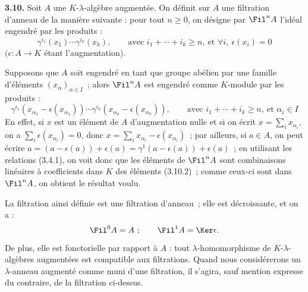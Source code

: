 \textbf{3.10.}
Soit \(A\) une \(K\)-\(\lambda\)-algèbre augmentée. On définit sur \(A\) une filtration d'anneau de la manière suivante : pour tout \(n\ge0\), on désigne par \(\Fil^n A\) l'idéal engendré par les produits :
\begin{equation}\tag{3.10.1}
  \gamma^{i_1}(x_1)\cdots\gamma^{i_k}(x_k),
  \qquad \text{avec } i_1+\cdots+i_k\ge n,\ \text{et } \forall i,\ \epsilon(x_i)=0
\end{equation}
\((\epsilon:A\to K\) étant l'augmentation).

Supposons que \(A\) soit engendré en tant que groupe abélien par une famille d'éléments \((x_\alpha)_{\alpha\in I}\)~; alors \(\Fil^n A\) est engendré comme \(K\)-module par les produits :
\begin{equation}\tag{3.10.2}
  \gamma^{i_1}(x_{\alpha_1}-\epsilon(x_{\alpha_1}))\cdots
  \gamma^{i_k}(x_{\alpha_k}-\epsilon(x_{\alpha_k})),
  \qquad \text{avec } i_1+\cdots+i_k\ge n,\ \text{et } \alpha_i\in I
\end{equation}
En effet, si \(x\) est un élément de \(A\) d'augmentation nulle et si on écrit \(x=\sum_i x_{\alpha_i}\), on a \(\sum_i \epsilon(x_{\alpha_i})=0\), donc \(x=\sum_i x_{\alpha_i}-\epsilon(x_{\alpha_i})\)~; par ailleurs, si \(a\in A\), on peut écrire \(a=(a-\epsilon(a))+\epsilon(a)=\gamma^1(a-\epsilon(a))+\epsilon(a)\)~; en utilisant les relations (3.4.1), on voit donc que les éléments de \(\Fil^n A\) sont combinaisons linéaires à coefficients dans \(K\) des éléments (3.10.2)~; comme ceux-ci sont dans \(\Fil^n A\), on obtient le résultat voulu.

La filtration ainsi définie est une filtration d'anneau~; elle est décroissante, et on a :
\[
  \Fil^0A=A~;
  \qquad \Fil^1A=\Ker\epsilon.
\]
De plus, elle est fonctorielle par rapport à \(A\) : tout \(\lambda\)-homomorphisme de \(K\)-\(\lambda\)-algèbres augmentées est compatible aux filtrations. Quand nous considérerons un \(\lambda\)-anneau augmenté comme muni d'une filtration, il s'agira, sauf mention expresse du contraire, de la filtration ci-dessus.

